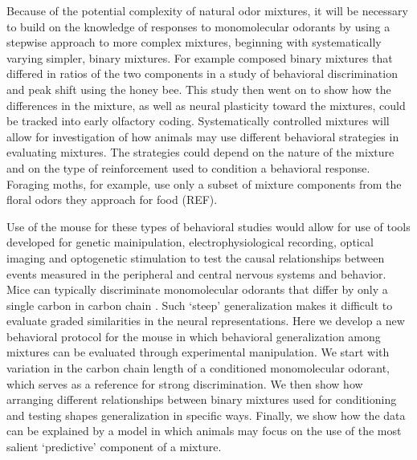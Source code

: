Because of the potential complexity of natural odor mixtures, it will be necessary to build on the knowledge of responses to monomolecular odorants by using a stepwise approach to more complex mixtures, beginning with systematically varying simpler, binary mixtures. 
For example \cite{19692594} composed binary mixtures that differed in ratios of the two components in a study of behavioral discrimination and peak shift using the honey bee. 
This study then went on to show how the differences in the mixture, as well as neural plasticity toward the mixtures, could be tracked into early olfactory coding. 
Systematically controlled mixtures will allow for investigation of how animals may use different behavioral strategies in evaluating mixtures. 
The strategies could depend on the nature of the mixture and on the type of reinforcement used to condition a behavioral response. 
Foraging moths, for example, use only a subset of mixture components from the floral odors they approach for food (REF). 

Use of the mouse for these types of behavioral studies would allow for use of tools developed for genetic mainipulation, electrophysiological recording, optical imaging and optogenetic stimulation to test the causal relationships between events measured in the peripheral and central nervous systems and behavior. 
Mice can typically discriminate monomolecular odorants that differ by only a single carbon in carbon chain \cite{18810459}. 
Such ‘steep’ generalization makes it difficult to evaluate graded similarities in the neural representations. 
Here we develop a new behavioral protocol for the mouse in which behavioral generalization among mixtures can be evaluated through experimental manipulation. 
We start with variation in the carbon chain length of a conditioned monomolecular odorant, which serves as a reference for strong discrimination. 
We then show how arranging different relationships between binary mixtures used for conditioning and testing shapes generalization in specific ways. 
Finally, we show how the data can be explained by a model in which animals may focus on the use of the most salient ‘predictive’ component of a mixture. 
  